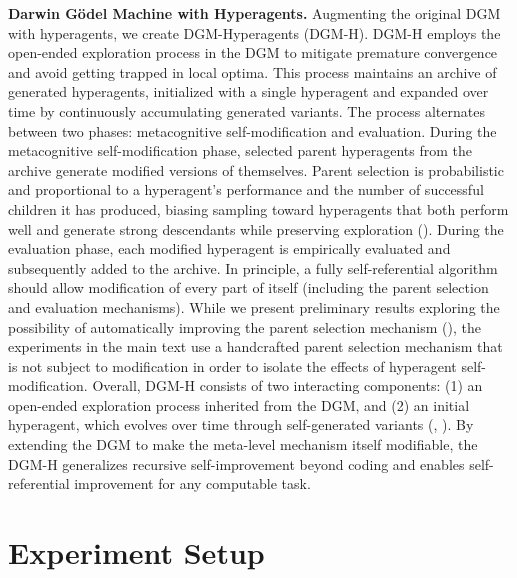 \documentclass[]{fairmeta}
\begin{document}
\textbf{Darwin G\"odel Machine with Hyperagents.}
Augmenting the original DGM \citep{zhang2025darwin} with hyperagents, we create DGM-Hyperagents (DGM-H). DGM-H employs the open-ended exploration process in the DGM to mitigate premature convergence and avoid getting trapped in local optima. This process maintains an archive of generated hyperagents, initialized with a single hyperagent and expanded over time by continuously accumulating generated variants. The process alternates between two phases: metacognitive self-modification and evaluation. During the metacognitive self-modification phase, selected parent hyperagents from the archive generate modified versions of themselves. Parent selection is probabilistic and proportional to a hyperagent's performance and the number of successful children it has produced, biasing sampling toward hyperagents that both perform well and generate strong descendants while preserving exploration (). During the evaluation phase, each modified hyperagent is empirically evaluated and subsequently added to the archive. In principle, a fully self-referential algorithm should allow modification of every part of itself (including the parent selection and evaluation mechanisms). While we present preliminary results exploring the possibility of automatically improving the parent selection mechanism (), the experiments in the main text use a handcrafted parent selection mechanism that is not subject to modification in order to isolate the effects of hyperagent self-modification. Overall, DGM-H consists of two interacting components: (1) an open-ended exploration process inherited from the DGM, and (2) an initial hyperagent, which evolves over time through self-generated variants (, ). By extending the DGM to make the meta-level mechanism itself modifiable, the DGM-H generalizes recursive self-improvement beyond coding and enables self-referential improvement for any computable task.

\section{Experiment Setup}
\label{sec:exp-setup}
\end{document}
